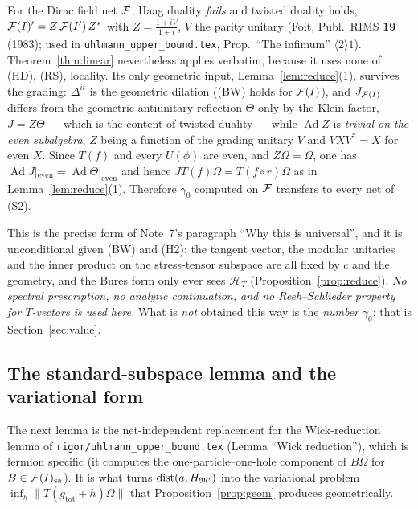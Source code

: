 \documentclass[11pt]{article}
\newcommand{\Om}{\Omega}
\newcommand{\Hil}{\mathcal H}
\newcommand{\norm}[1]{\lVert#1\rVert}
\newcommand{\dist}{\operatorname{dist}}
\newcommand{\HMp}{H_{\cM'}}
\newcommand{\HT}{\Hil_T}
\newcommand{\gtot}{g_{\mathrm{tot}}}
\newcommand{\Ad}{\operatorname{Ad}}
\begin{document}
\begin{remark}\label{rem:klein}
For the Dirac field net $\mathcal F$, Haag duality \emph{fails} and twisted duality holds,
$\mathcal F(I)'=Z\,\mathcal F(I')\,Z^*$ with $Z=\frac{1+iV}{1+i}$, $V$ the parity unitary (Foit,
Publ.\ RIMS \textbf{19} (1983); used in \texttt{uhlmann\_upper\_bound.tex}, Prop.~``The infimum''
$\langle2\rangle1$).  Theorem~\ref{thm:linear} nevertheless applies verbatim, because it uses none of
(HD), (RS), locality.  Its only geometric input, Lemma~\ref{lem:reduce}(1), survives the grading:
$\Delta^{it}$ is the geometric dilation ((BW) holds for $\mathcal F(I)$), and $J_{\mathcal F(I)}$ differs from the
geometric antiunitary reflection $\Theta$ only by the Klein factor, $J=Z\Theta$ --- which is the content of
twisted duality --- while $\Ad Z$ is \emph{trivial on the even subalgebra}, $Z$ being a function of the
grading unitary $V$ and $VXV^*=X$ for even $X$.  Since $T(f)$ and every $U(\phi)$ are even, and
$Z\Om=\Om$, one has $\Ad J|_{\mathrm{even}}=\Ad\Theta|_{\mathrm{even}}$ and hence
$JT(f)\Om=T(f\circ r)\Om$ as in Lemma~\ref{lem:reduce}(1).  Therefore $\gamma_0$ computed on $\mathcal F$
transfers to every net of (S2).
\end{remark}

\begin{verdictok}
This is the precise form of Note~7's paragraph ``Why this is universal'', and it is unconditional given
\textup{(BW)} and \textup{(H2)}: the tangent vector, the modular unitaries and the inner product on the
stress-tensor subspace are all fixed by $c$ and the geometry, and the Bures form only ever sees $\HT$
(Proposition~\ref{prop:reduce}).  \emph{No spectral prescription, no analytic continuation, and no
Reeh--Schlieder property for $T$-vectors is used here.}  What is \emph{not} obtained this way is the
\emph{number} $\gamma_0$; that is Section~\ref{sec:value}.
\end{verdictok}

\subsection{The standard-subspace lemma and the variational form}

The next lemma is the net-independent replacement for the Wick-reduction lemma of
\texttt{rigor/uhlmann\_upper\_bound.tex} (Lemma ``Wick reduction''), which is fermion specific
(it computes the one-particle--one-hole component of $B\Om$ for $B\in\mathcal F(I)_{\mathrm{sa}}$).
It is what turns $\dist(a,\HMp)$ into the variational problem $\inf_h\norm{T(\gtot+h)\Om}$ that
Proposition~\ref{prop:geom} produces geometrically.
\end{document}
